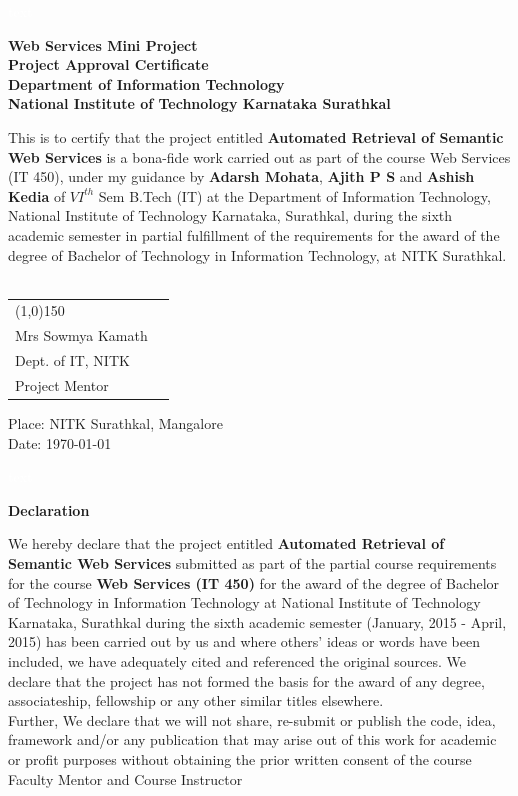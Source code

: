 \documentclass[12pt, oneside]{book}
\newcommand{\project}{Automated Retrieval of Semantic Web Services}
\begin{document}
 \pagebreak \textcolor{white}{text}
\thispagestyle{empty}
\pagebreak
\begin{center}
\Huge
\textbf{Web Services Mini Project} \\
\textbf{Project Approval Certificate} \\
\vspace{1cm} \Large
\textbf{Department of Information Technology} \\ \vspace{0.5cm}
\textbf{National Institute of Technology Karnataka Surathkal}
\vspace{3cm}
\end{center}
This is to certify that the project entitled \textbf{\project} is a bona-fide work carried out as part of the course Web Services (IT 450), under my guidance by \textbf{Adarsh Mohata}, \textbf{Ajith P S} and \textbf{Ashish Kedia} of $VI^{th}$ Sem B.Tech (IT) at the Department of Information Technology, National Institute of Technology Karnataka, Surathkal, during the sixth academic semester in partial fulfillment of the requirements for the award of the degree of Bachelor of Technology in Information Technology, at NITK Surathkal.  \\
\vspace{3cm}
\\
\begin{tabular}{l@{\hskip 4cm} r}
	\line(1,0){150} \\
	 Mrs Sowmya Kamath  \\
	 Dept. of IT, NITK  \\
	 Project Mentor  \\ 
\end{tabular}

\vspace{4cm}
\begin{flushleft}
Place: NITK Surathkal, Mangalore \\
Date: \today
\end{flushleft}
\pagebreak \textcolor{white}{text} \pagebreak
\thispagestyle{empty}
\begin{center}
\Huge
\textbf{Declaration} \\
\end{center}
We hereby declare that the project entitled \textbf{\project} submitted as part of the partial course requirements for the course \textbf{Web Services (IT 450)} for the award of the degree of Bachelor of Technology in Information Technology at National Institute of Technology Karnataka, Surathkal during the sixth academic semester (January, 2015 - April, 2015) has been carried out by us and where others' ideas or words have been included, we have adequately cited and referenced the original sources. We declare that the project has not formed the basis for the award of any degree, associateship, fellowship or any other similar titles elsewhere. \\
Further, We declare that we will not share, re-submit or publish the code, idea, framework and/or any publication that may arise out of this work for academic or profit purposes without obtaining the prior written consent of the course Faculty Mentor and Course Instructor \\
\vspace{2cm}
\end{document}

